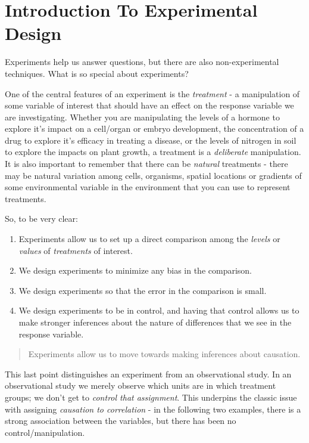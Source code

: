 \documentclass[
]{book}
\providecommand{\tightlist}{%
  \setlength{\itemsep}{0pt}\setlength{\parskip}{0pt}}
\begin{document}
\chapter{Introduction To Experimental Design}\label{introduction-to-experimental-design}

Experiments help us answer questions, but there are also non-experimental techniques. What is so special about experiments?

One of the central features of an experiment is the \emph{treatment} - a manipulation of some variable of interest that should have an effect on the response variable we are investigating. Whether you are manipulating the levels of a hormone to explore it's impact on a cell/organ or embryo development, the concentration of a drug to explore it's efficacy in treating a disease, or the levels of nitrogen in soil to explore the impacts on plant growth, a treatment is a \emph{deliberate} manipulation.\\
It is also important to remember that there can be \emph{natural} treatments - there may be natural variation among cells, organisms, spatial locations or gradients of some environmental variable in the environment that you can use to represent treatments.

So, to be very clear:

\begin{enumerate}
\def\labelenumi{\arabic{enumi}.}
\tightlist
\item
  Experiments allow us to set up a direct comparison among the \emph{levels} or \emph{values} of \emph{treatments} of interest.
\item
  We design experiments to minimize any bias in the comparison.
\item
  We design experiments so that the error in the comparison is small.
\item
  We design experiments to be in control, and having that control allows us to make stronger inferences about the nature of differences that we see in the response variable.
\end{enumerate}

\begin{quote}
Experiments allow us to move towards making inferences about causation.
\end{quote}

This last point distinguishes an experiment from an observational study. In an observational study we merely observe which units are in which treatment groups; we don't get to \emph{control that assignment}. This underpins the classic issue with assigning \emph{causation to correlation} - in the following two examples, there is a strong association between the variables, but there has been no control/manipulation.
\end{document}

